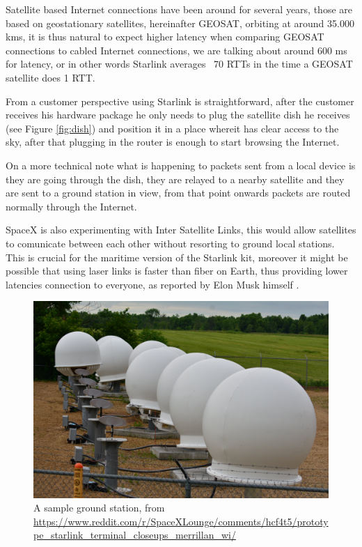 \documentclass[IN,11pt,twoside,openright,bachelor,english]{tumthesis}
\begin{document}
Satellite based Internet connections have been around for several years, those are based on geostationary satellites, hereinafter GEOSAT, orbiting at around 35.000 kms, it is thus natural to expect higher latency when comparing GEOSAT connections to cabled Internet connections, we are talking about around 600 ms for latency, or in other words Starlink averages ~70 RTTs in the time a GEOSAT satellite does 1 RTT.

From a customer perspective using Starlink is straightforward, after the customer receives his hardware package he only needs to plug the satellite dish he receives (see Figure \ref{fig:dish}) and position it in a place whereit has clear access to the sky, after that plugging in the router is enough to start browsing the Internet.

On a more technical note what is happening to packets sent from a local device is they are going through the dish, they are relayed to a nearby satellite and they are sent to a ground station in view, from that point onwards packets are routed normally through the Internet.

SpaceX is also experimenting with Inter Satellite Links, this would allow satellites to comunicate between each other without resorting to ground local stations. This is crucial for the maritime version of the Starlink kit, moreover it might be possible that using laser links is faster than fiber on Earth, thus providing lower latencies connection to everyone, as reported by Elon Musk himself \cite{tweet}.

\begin{figure}
	\centering
	\includegraphics[width=0.6\columnwidth]{img/ground-station.jpeg}
	\caption{A sample ground station, from \url{https://www.reddit.com/r/SpaceXLounge/comments/hcf4t5/prototype_starlink_terminal_closeups_merrillan_wi/}}
	\label{fig:gs}
\end{figure}
\end{document}
